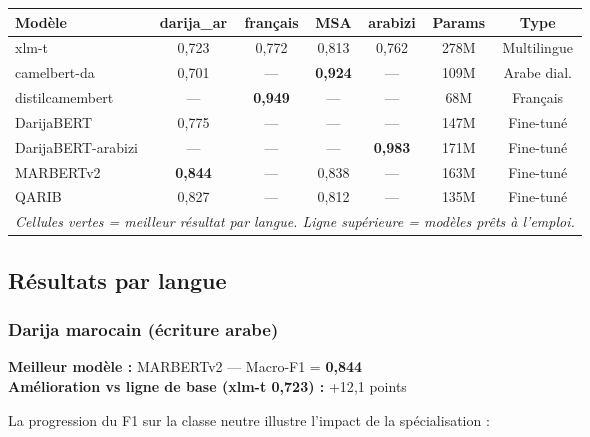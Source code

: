 \documentclass[12pt, a4paper]{article}
\begin{document}
\begin{center}
\setlength{\tabcolsep}{5pt}
\begin{tabular}{lcccccc}
\toprule
\textbf{Modèle} & \textbf{darija\_ar} & \textbf{français} & \textbf{MSA} &
\textbf{arabizi} & \textbf{Params} & \textbf{Type} \\
\midrule
xlm-t           & 0{,}723 & 0{,}772 & 0{,}813 & 0{,}762 & 278M & Multilingue \\
camelbert-da    & 0{,}701 &  —      & \cellcolor{goodgreen!30}\textbf{0{,}924} &  —  & 109M & Arabe dial. \\
distilcamembert &  —      & \cellcolor{goodgreen!30}\textbf{0{,}949} &  —  &  —  & 68M  & Français \\
\midrule
DarijaBERT      & 0{,}775 &  —      &  —      &  —      & 147M & Fine-tuné \\
DarijaBERT-arabizi &  —   &  —      &  —      & \cellcolor{goodgreen!30}\textbf{0{,}983} & 171M & Fine-tuné \\
MARBERTv2       & \cellcolor{goodgreen!30}\textbf{0{,}844} &  — & 0{,}838 &  — & 163M & Fine-tuné \\
QARIB           & 0{,}827 &  —      & 0{,}812 &  —      & 135M & Fine-tuné \\
\bottomrule
\multicolumn{7}{l}{\small\textit{Cellules vertes = meilleur résultat par langue. Ligne supérieure = modèles prêts à l'emploi.}}
\end{tabular}
\end{center}

\subsection{Résultats par langue}

\subsubsection{Darija marocain (écriture arabe)}

\begin{resultbox}
\textbf{Meilleur modèle :} MARBERTv2 — Macro-F1 = \textbf{0{,}844}\\
\textbf{Amélioration vs ligne de base (xlm-t 0{,}723) :} +12{,}1 points
\end{resultbox}

La progression du F1 sur la classe neutre illustre l'impact de la spécialisation :
\end{document}
